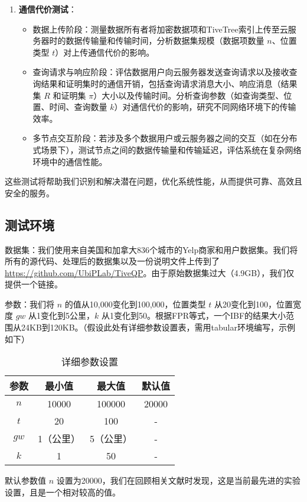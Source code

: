 \documentclass{cumcmthesis}
\numberwithin{equation}{section} %
\numberwithin{figure}{section} %
\numberwithin{table}{section} %
\begin{document}
\begin{enumerate}
\begin{itemize}
        \end{itemize}
    \item \textbf{通信代价测试}：
        \begin{itemize}
            \item 数据上传阶段：测量数据所有者将加密数据项和TiveTree索引上传至云服务器时的数据传输量和传输时间，分析数据集规模（数据项数量 \(n\)、位置类型 \(t\)）对上传通信代价的影响。
            \item 查询请求与响应阶段：评估数据用户向云服务器发送查询请求以及接收查询结果和证明集时的通信开销，包括查询请求消息大小、响应消息（结果集 \(R\) 和证明集 \(\pi\)）大小以及传输时间。分析查询参数（如查询类型、位置、时间、查询数量 \(k\)）对通信代价的影响，研究不同网络环境下的传输效率。
            \item 多节点交互阶段：若涉及多个数据用户或云服务器之间的交互（如在分布式场景下），测试节点之间的数据传输量和传输延迟，评估系统在复杂网络环境中的通信性能。
        \end{itemize}
\end{enumerate}

这些测试将帮助我们识别和解决潜在问题，优化系统性能，从而提供可靠、高效且安全的服务。

\subsection{测试环境}
数据集：我们使用来自美国和加拿大836个城市的Yelp商家和用户数据集\cite{文献1,文献2}。我们将所有的源代码、处理后的数据集以及一份说明文件上传到了\url{https://github.com/UbiPLab/TiveQP}。由于原始数据集过大（4.9GB），我们仅提供一个链接。

参数：我们将 \(n\) 的值从10,000变化到100,000，位置类型 \(t\) 从20变化到100，位置宽度 \(gw\) 从1变化到5公里，\(k\) 从1变化到50。根据FPR等式\cite{文献3,文献4}，一个IBF的结果大小范围从24KB到120KB。（假设此处有详细参数设置表，需用tabular环境编写，示例如下）
\begin{table}[h]
    \centering
    \begin{tabular}{|c|c|c|c|}
        \hline
        参数 & 最小值 & 最大值 & 默认值\\
        \hline
        \(n\) & 10000 & 100000 & 20000\\
        \hline
        \(t\) & 20 & 100 & -\\
        \hline
        \(gw\) & 1（公里） & 5（公里） & -\\
        \hline
        \(k\) & 1 & 50 & -\\
        \hline
    \end{tabular}
    \caption{详细参数设置}
\end{table}
默认参数值 \(n\) 设置为20000，我们在回顾相关文献时发现，这是当前最先进的实验设置，且是一个相对较高的值。
\end{document}
